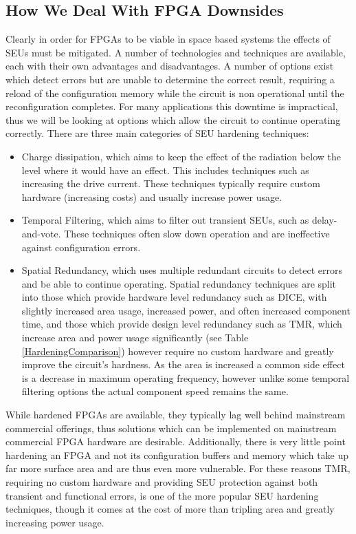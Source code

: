 \documentclass[12pt,drafta4paper,oneside]{memoir} %
\begin{document}
\subsection{How We Deal With \ac{FPGA} Downsides}
Clearly in order for \acp{FPGA} to be viable in space based systems the effects of \acp{SEU} must be mitigated. A number of technologies and techniques are available, each with their own advantages and disadvantages. A number of options exist which detect errors but are unable to determine the correct result, requiring a reload of the configuration memory while the circuit is non operational until the reconfiguration completes. For many applications this downtime is impractical, thus we will be looking at options which allow the circuit to continue operating correctly.
There are three main categories of \ac{SEU} hardening techniques\cite{HardeningTechniques}:
\begin{itemize}
    \item Charge dissipation, which aims to keep the effect of the radiation below the level where it would have an effect. This includes techniques such as increasing the drive current. These techniques typically require custom hardware (increasing costs) and usually increase power usage.
    \item Temporal Filtering, which aims to filter out transient \acp{SEU}, such as delay-and-vote\cite{HardeningTechniques}. These techniques often slow down operation and are ineffective against configuration errors.
    \item Spatial Redundancy, which uses multiple redundant circuits to detect errors and be able to continue operating. Spatial redundancy techniques are split into those which provide hardware level redundancy such as \ac{DICE}, with slightly increased area usage, increased power, and often increased component time, and those which provide design level redundancy such as \ac{TMR}, which increase area and power usage significantly (see Table \ref{HardeningComparison}) however require no custom hardware and greatly improve the circuit's hardness. As the area is increased a common side effect is a decrease in maximum operating frequency, however unlike some temporal filtering options the actual component speed remains the same.
\end{itemize}
While hardened \acp{FPGA} are available, they typically lag well behind mainstream commercial offerings\cite{VFPGATMR}, thus solutions which can be implemented on mainstream commercial \ac{FPGA} hardware are desirable. Additionally, there is very little point hardening an \ac{FPGA} and not its configuration buffers and memory which take up far more surface area\cite{FPGAArchitecture} and are thus even more vulnerable.
For these reasons \ac{TMR}, requiring no custom hardware and providing \ac{SEU} protection against both transient and functional errors, is one of the more popular \ac{SEU} hardening techniques, though it comes at the cost of more than tripling area and greatly increasing power usage.
\end{document}
